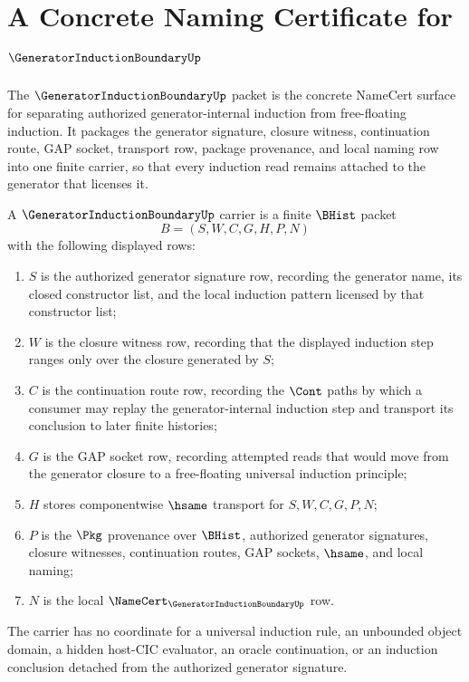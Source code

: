 \chapter{A Concrete Naming Certificate for $\GeneratorInductionBoundaryUp$}
\label{ch:concrete-instances-generatorinductionboundary-namecert}

The $\GeneratorInductionBoundaryUp$ packet is the concrete NameCert surface for separating authorized generator-internal induction from free-floating induction. It packages the generator signature, closure witness, continuation route, GAP socket, transport row, package provenance, and local naming row into one finite carrier, so that every induction read remains attached to the generator that licenses it.

\begin{definition}
\label{def:generator-induction-boundary-carrier}
A $\GeneratorInductionBoundaryUp$ carrier is a finite $\BHist$ packet
$$
B=(S,W,C,G,H,P,N)
$$
with the following displayed rows:
\begin{enumerate}
\item $S$ is the authorized generator signature row, recording the generator name, its closed constructor list, and the local induction pattern licensed by that constructor list;
\item $W$ is the closure witness row, recording that the displayed induction step ranges only over the closure generated by $S$;
\item $C$ is the continuation route row, recording the $\Cont$ paths by which a consumer may replay the generator-internal induction step and transport its conclusion to later finite histories;
\item $G$ is the GAP socket row, recording attempted reads that would move from the generator closure to a free-floating universal induction principle;
\item $H$ stores componentwise $\hsame$ transport for $S,W,C,G,P,N$;
\item $P$ is the $\Pkg$ provenance over $\BHist$, authorized generator signatures, closure witnesses, continuation routes, GAP sockets, $\hsame$, and local naming;
\item $N$ is the local $\NameCert_{\GeneratorInductionBoundaryUp}$ row.
\end{enumerate}
The carrier has no coordinate for a universal induction rule, an unbounded object domain, a hidden host-CIC evaluator, an oracle continuation, or an induction conclusion detached from the authorized generator signature.
\end{definition}

